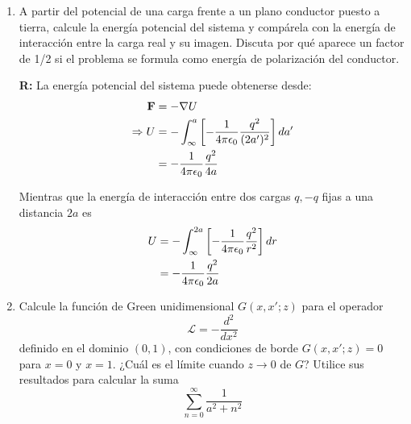 \documentclass[]{article}
\numberwithin{equation}{section}
\newcommand{\0}{\textcolor{gray}{0}}
\newcommand{\gr}{\nabla}
\newcommand{\rv}{\mathbf{r}}
\newcommand{\rdif}{\rv - \rv'}
\newcommand{\td}[2]{\dfrac{d #1}{d #2}}
\newcommand{\n}[1]{\mathbf{#1}}
\begin{document}
\begin{enumerate}
	Para que sea adecuada debe cumplir con
	\begin{equation*}
		\nabla'^2 G(\rv,\rv') = -4 \pi \delta(\rdif)
	\end{equation*}
	\begin{align*}
		\nabla'^2 G_{D} (\rv, \rv') &= \nabla'^2 \frac{1}{|\rdif|} - \nabla'^2\frac{1}{|\rdif^*|}\\
		&= -4 \pi \delta(\rdif) + 4 \pi \delta(\rdif^*)
	\end{align*}
	pero \(\delta(\rdif^*)\) siempre es 0 en \(z > 0\), por lo que:
	\begin{equation*}
		\nabla'^2 G_{D} (\rv, \rv') = -4 \pi \delta(\rdif)
	\end{equation*}
	
	\item A partir del potencial de una carga frente a un plano conductor puesto a tierra, calcule la	energía potencial del sistema y compárela con la energía de interacción entre la carga real y su	imagen. Discuta por qué aparece un factor de 1/2 si el problema se formula como energía de	polarización del conductor.
	
	\textbf{R:} La energía potencial del sistema puede obtenerse desde:
	\begin{align*}
		\n{F} &= -\gr U\\
		\Rightarrow U &= - \int_{\infty}^{a} \left[- \ke \frac{q^2}{(2a')^2}\right] da'\\
		&= -\ke \frac{q^2}{4 a}
	\end{align*}
	
	Mientras que la energía de interacción entre dos cargas \(q, -q\) fijas a una distancia \(2 a\) es
	\begin{align*}
		U &= - \int_{\infty}^{2a} \left[- \ke \frac{q^2}{r^2}\right] dr\\
		&= -\ke \frac{q^2}{2 a}
	\end{align*}
	
	\item Calcule la función de Green unidimensional \(G(x, x'; z)\) para el operador
	\begin{equation*}
		\mathcal{L} = - \td{^2}{x^2}
	\end{equation*}
	definido en el dominio \((0, 1)\), con condiciones de borde \(G(x, x'; z) = 0\) para \(x = 0\) y \(x = 1\). ¿Cuál es el límite cuando \(z \rightarrow 0\) de \(G\)? Utilice sus resultados para calcular la suma
	\begin{equation*}
		\sum_{n=0}^{\infty} \frac{1}{a^2 + n^2}
	\end{equation*}
	

\end{enumerate}
\end{document}
